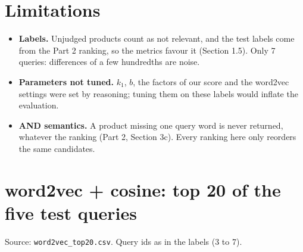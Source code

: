 \documentclass[10pt,a4paper]{article}
\newcommand{\file}[1]{\texttt{\small #1}}
\begin{document}
\section{Limitations}
\begin{itemize}
\item \textbf{Labels.} Unjudged products count as not relevant, and the test labels come from the Part 2
  ranking, so the metrics favour it (Section 1.5). Only 7 queries: differences of a few hundredths are
  noise.
\item \textbf{Parameters not tuned.} $k_1$, $b$, the factors of our score and the word2vec settings were
  set by reasoning; tuning them on these labels would inflate the evaluation.
\item \textbf{AND semantics.} A product missing one query word is never returned, whatever the ranking
  (Part 2, Section 3c). Every ranking here only reorders the same candidates.
\end{itemize}

\appendix
\section{word2vec + cosine: top 20 of the five test queries}\label{app:w2v}
\small
Source: \file{word2vec\_top20.csv}. Query ids as in the labels (3 to 7).

\end{document}
